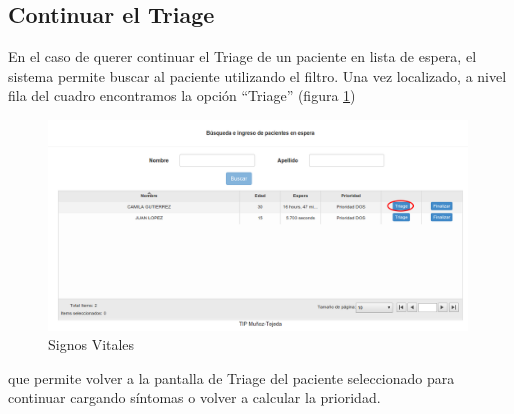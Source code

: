 \subsection{Continuar el Triage}
En el caso de querer continuar el Triage de un paciente en lista de espera, el sistema permite buscar al paciente utilizando el filtro. Una vez localizado, a nivel fila del cuadro encontramos la opción ``Triage'' (figura \ref{fig:espera1})
\begin{figure}
\centerline{\includegraphics[width=0.99\textwidth]{espera1.png}}
\caption{Signos Vitales} \label{fig:espera1}
\end{figure}
que permite volver a la pantalla de Triage del paciente seleccionado para continuar cargando síntomas o volver a calcular la prioridad.

